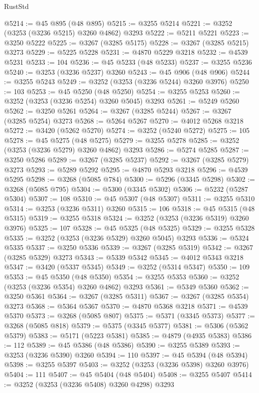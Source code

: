 \begin{lexlean}{RustStd}
\begin{coremodule}
@5214 := @45 @895 (@48 @895)
@5215 := @3255 @5214
@5221 := @3252 (@3253 (@3236 @5215) @3260 @4862) @3293
@5222 := @5211 @5221
@5223 := @3250 @5222
@5225 := @3267 (@3285 @5175)
@5228 := @3267 (@3285 @5215) @3273
@5229 := @5225 @5228
@5231 := @4870 @5229 @3218
@5232 := @4539 @5231
@5233 := 104
@5236 := @45 @5233 (@48 @5233)
@5237 := @3255 @5236
@5240 := @3253 (@3236 @5237) @3260
@5243 := @45 @906 (@48 @906)
@5244 := @3255 @5243
@5249 := @3252 (@3253 (@3236 @5244) @3260 @3976)
@5250 := 103
@5253 := @45 @5250 (@48 @5250)
@5254 := @3255 @5253
@5260 := @3252 (@3253 (@3236 @5254) @3260 @5045) @3293
@5261 := @5249 @5260
@5262 := @3250 @5261
@5264 := @3267 (@3285 @5244)
@5267 := @3267 (@3285 @5254) @3273
@5268 := @5264 @5267
@5270 := @4012 @5268 @3218
@5272 := @3420 (@5262 @5270)
@5274 := @3252 (@5240 @5272)
@5275 := 105
@5278 := @45 @5275 (@48 @5275)
@5279 := @3255 @5278
@5285 := @3252 (@3253 (@3236 @5279) @3260 @4862) @3293
@5286 := @5274 @5285
@5287 := @3250 @5286
@5289 := @3267 (@3285 @5237)
@5292 := @3267 (@3285 @5279) @3273
@5293 := @5289 @5292
@5295 := @4870 @5293 @3218
@5296 := @4539 @5295
@5298 := @3268 (@5085 @784)
@5300 := @5296 (@3345 @5298)
@5302 := @3268 (@5085 @795)
@5304 := @5300 (@3345 @5302)
@5306 := @5232 (@5287 @5304)
@5307 := 108
@5310 := @45 @5307 (@48 @5307)
@5311 := @3255 @5310
@5314 := @3253 (@3236 @5311) @3260
@5315 := 106
@5318 := @45 @5315 (@48 @5315)
@5319 := @3255 @5318
@5324 := @3252 (@3253 (@3236 @5319) @3260 @3976)
@5325 := 107
@5328 := @45 @5325 (@48 @5325)
@5329 := @3255 @5328
@5335 := @3252 (@3253 (@3236 @5329) @3260 @5045) @3293
@5336 := @5324 @5335
@5337 := @3250 @5336
@5339 := @3267 (@3285 @5319)
@5342 := @3267 (@3285 @5329) @3273
@5343 := @5339 @5342
@5345 := @4012 @5343 @3218
@5347 := @3420 (@5337 @5345)
@5349 := @3252 (@5314 @5347)
@5350 := 109
@5353 := @45 @5350 (@48 @5350)
@5354 := @3255 @5353
@5360 := @3252 (@3253 (@3236 @5354) @3260 @4862) @3293
@5361 := @5349 @5360
@5362 := @3250 @5361
@5364 := @3267 (@3285 @5311)
@5367 := @3267 (@3285 @5354) @3273
@5368 := @5364 @5367
@5370 := @4870 @5368 @3218
@5371 := @4539 @5370
@5373 := @3268 (@5085 @807)
@5375 := @5371 (@3345 @5373)
@5377 := @3268 (@5085 @818)
@5379 := @5375 (@3345 @5377)
@5381 := @5306 (@5362 @5379)
@5383 := @5171 (@5223 @5381)
@5385 := @4879 (@4935 @5383)
@5386 := 112
@5389 := @45 @5386 (@48 @5386)
@5390 := @3255 @5389
@5393 := @3253 (@3236 @5390) @3260
@5394 := 110
@5397 := @45 @5394 (@48 @5394)
@5398 := @3255 @5397
@5403 := @3252 (@3253 (@3236 @5398) @3260 @3976)
@5404 := 111
@5407 := @45 @5404 (@48 @5404)
@5408 := @3255 @5407
@5414 := @3252 (@3253 (@3236 @5408) @3260 @4298) @3293

\end{coremodule}
\end{lexlean}
